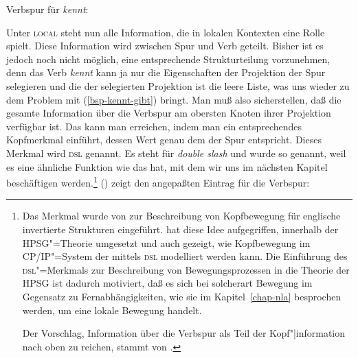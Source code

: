 \ea
\label{le-verbspur-kennt-ohne-dsl}
Verbspur für \emph{kennt}:\\\samepage
{}
\z

\noindent
Unter \textsc{local} steht nun alle Information, die in lokalen Kontexten eine Rolle spielt.
Diese Information wird zwischen Spur und Verb geteilt. Bisher ist es jedoch noch nicht möglich,
eine entsprechende Strukturteilung vorzunehmen, denn das Verb \emph{kennt} kann ja nur
die Eigenschaften der Projektion der Spur selegieren und die \subcatl der selegierten
Projektion ist die leere Liste, was uns wieder zu dem Problem mit (\ref{bsp-kennt-gibt}) bringt. Man
muß also sicherstellen, daß die gesamte Information über die Verbspur am obersten Knoten
ihrer Projektion verfügbar ist. Das kann man erreichen, indem man ein entsprechendes Kopfmerkmal
einführt, dessen Wert genau dem \localw der Spur entspricht. Dieses Merkmal wird \textsc{dsl}
genannt. Es steht für \emph{double slash} und wurde so genannt, weil es eine ähnliche
Funktion wie das \slashm hat, mit dem wir uns im nächsten Kapitel beschäftigen werden.\footnote{
  Das Merkmal \dsl wurde von \citet*{Jacobson87} zur Beschreibung von Kopfbewegung 
  für englische invertierte Strukturen eingeführt. \citet{Borsley89}
  hat diese Idee aufgegriffen, innerhalb der HPSG"=Theorie umgesetzt und 
  auch gezeigt, wie Kopfbewegung im CP/IP"=System der \gbt mittels \textsc{dsl} modelliert werden
  kann.
  Die Einführung des \textsc{dsl}"=Merkmals zur Beschreibung von Bewegungsprozessen
  in die Theorie der HPSG ist dadurch motiviert, daß es sich bei solcherart Bewegung
  im Gegensatz zu Fernabhängigkeiten, wie sie im Kapitel~\ref{chap-nla}
  besprochen werden, um eine lokale Bewegung handelt.

  Der Vorschlag, Information über die Verbspur als Teil der Kopf"|information nach oben zu reichen,
  stammt von \citet{Oliva92a}.%
}
() zeigt den angepaßten Eintrag für die Verbspur:

